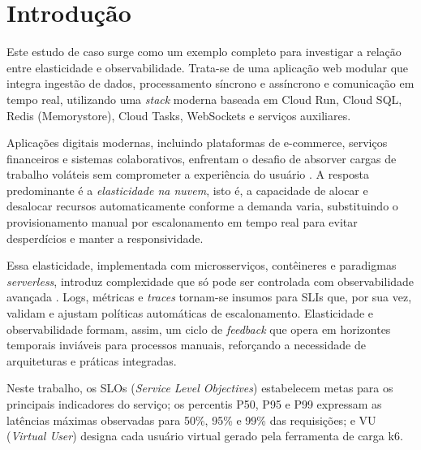 \section{Introdução}
\label{sec:introducao}

Este estudo de caso surge como um exemplo completo para investigar a relação entre
elasticidade e observabilidade. Trata-se de uma aplicação web modular que integra ingestão
de dados, processamento síncrono e assíncrono e comunicação em tempo real, utilizando uma
\textit{stack} moderna baseada em Cloud Run, Cloud SQL, Redis (Memorystore), Cloud Tasks,
WebSockets e serviços auxiliares.

Aplicações digitais modernas, incluindo plataformas de e-commerce, serviços financeiros e
sistemas colaborativos, enfrentam o desafio de absorver cargas de trabalho voláteis sem
comprometer a experiência do usuário \cite{google_elasticity_2024}. A resposta predominante
é a \textit{elasticidade na nuvem}, isto é, a capacidade de alocar e desalocar recursos
automaticamente conforme a demanda varia, substituindo o provisionamento manual por
escalonamento em tempo real para evitar desperdícios e manter a responsividade.

Essa elasticidade, implementada com microsserviços, contêineres e paradigmas
\textit{serverless}, introduz complexidade que só pode ser controlada com observabilidade
avançada \cite{newrelic_observability_2023}. Logs, métricas e \textit{traces} tornam-se insumos
para SLIs que, por sua vez, validam e ajustam políticas automáticas de escalonamento.
Elasticidade e observabilidade formam, assim, um ciclo de \textit{feedback} que opera em
horizontes temporais inviáveis para processos manuais, reforçando a necessidade de
arquiteturas e práticas integradas.

Neste trabalho, os SLOs (\textit{Service Level Objectives}) estabelecem metas para os principais indicadores do serviço; os percentis P50, P95 e P99 expressam as latências máximas observadas para 50\%, 95\% e 99\% das requisições; e VU (\textit{Virtual User}) designa cada usuário virtual gerado pela ferramenta de carga k6.


